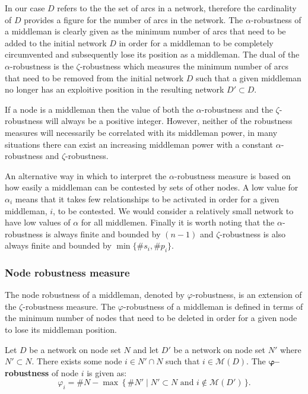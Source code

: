 In our case $D$ refers to the the set of arcs in a network, therefore the cardinality of $D$ provides a figure for the number of arcs in the network. The $\alpha$-robustness of a middleman is clearly given as the minimum number of arcs that need to be added to the initial network $D$ in order for a middleman to be completely circumvented and subsequently lose its position as a middleman. The dual of the $\alpha$-robustness is the $\zeta$-robustness which measures the minimum number of arcs that need to be removed from the initial network $D$ such that a given middleman no longer has an exploitive position in the resulting network $D' \subset D$.

If a node is a middleman then the value of both the $\alpha$-robustness and the $\zeta$-robustness will always be a positive integer. However, neither of the robustness measures will necessarily be correlated with its middleman power, in many situations there can exist an increasing middleman power with a constant $\alpha$-robustness and $\zeta$-robustness.

An alternative way in which to interpret the $\alpha$-robustness measure is based on how easily a middleman can be contested by sets of other nodes. A low value for $\alpha_{i}$ means that it takes few relationships to be activated in order for a given middleman, $i$, to be contested. We would consider a relatively small network to have low values of $\alpha$ for all middlemen. Finally it is worth noting that the $\alpha$-robustness is always finite and bounded by $(n-1)$ and $\zeta$-robustness is also always finite and bounded by $\min \{ \# s_{i}, \# p_{i} \}$. 

\subsubsection{Node robustness measure}

The node robustness of a middleman, denoted by $\varphi$-robustness, is an extension of the $\zeta$-robustness measure. The $\varphi$-robustness of a middleman is defined in terms of the minimum number of nodes that need to be deleted in order for a given node to lose its middleman position.

\begin{definition}
Let $D$ be a network on node set $N$ and let $D'$ be a network on node set $N'$ where $N' \subset N$. There exists some node $i \in N' \cap N$ such that $i \in \mathcal{M}(D)$. The \textbf{$\mathbf{\varphi}$--robustness} of node $i$ is given as:
\begin{equation}
\varphi_{i} = \# N - \max \, \{ \, \# N' \mid N' \subset N \mbox{ and } i \notin \mathcal{M}(D') \, \} . 
\end{equation}
\end{definition}

